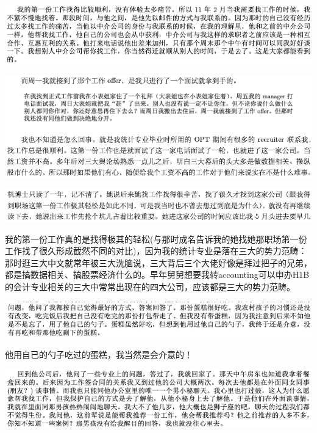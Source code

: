 \documentclass[9pt, b5paper]{article}
\begin{document}
\begin{center}
\includegraphics[width=.9\linewidth]{./pic/backups_plans_20210412_104359.png}
\end{center}

\begin{center}
\includegraphics[width=.9\linewidth]{./pic/backups_plans_20210412_113237.png}
\end{center}

\begin{center}
\includegraphics[width=.9\linewidth]{./pic/backups_plans_20210412_113317.png}
\end{center}

我的第一份工作真的是找得极其的轻松(与那时成名告诉我的她找她那职场第一份工作找了很久形成截然不同的对比)，因为我的统计专业是落在三大的势力范畴：那时逛三大中文就常年被三大洗脑说，三大背后三个大佬好像是拜过把子的兄弟，都是搞数据相关、搞股票经济什么的。早年舅舅想要我转accounting可以申办H1B的会计专业相关的三大中常常出现在的四大公司，应该都是三大的势力范畴。

\begin{center}
\includegraphics[width=.9\linewidth]{./pic/backups_plans_20210412_104506.png}
\end{center}

他用自已的勺子吃过的蛋糕，我当然是会介意的！

\begin{center}
\includegraphics[width=.9\linewidth]{./pic/backups_plans_20210412_104626.png}
\end{center}
\end{document}
